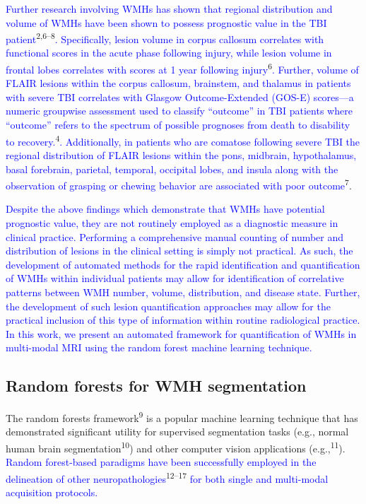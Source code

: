 \documentclass[11pt,]{article}
\begin{document}
\textcolor{blue}{Further research involving WMHs has shown that regional distribution and volume of WMHs have been shown to possess prognostic value in the TBI patient}\textsuperscript{2,6--8}\textcolor{blue}{. Specifically, lesion volume in corpus callosum correlates with functional scores in the acute phase following injury, while lesion volume in frontal lobes correlates with scores at 1 year following injury}\textsuperscript{6}\textcolor{blue}{.
Further, volume of FLAIR lesions within the corpus
callosum, brainstem, and thalamus in patients with severe TBI correlates
with Glasgow Outcome-Extended (GOS-E) scores---a numeric groupwise assessment used to
classify ``outcome'' in TBI patients where ``outcome'' refers to the
spectrum of possible prognoses from death to disability to recovery.}\textsuperscript{4}\textcolor{blue}{. Additionally,
in patients who are comatose following severe TBI
the regional distribution of FLAIR lesions within the pons, midbrain, hypothalamus, basal forebrain, parietal, temporal, occipital lobes, and insula along with the observation of grasping or chewing behavior are associated with poor outcome}\textsuperscript{7}.

\textcolor{blue}{Despite the above findings which demonstrate that WMHs have potential prognostic value, they are not routinely employed as a diagnostic measure in clinical practice.  Performing a comprehensive manual counting of number and distribution of lesions in the clinical setting is simply not practical. As such, the development of automated methods for the rapid identification and quantification of WMHs within individual patients may allow for identification of correlative patterns between WMH number, volume, distribution, and disease state. Further, the development of such lesion quantification approaches may allow for the practical inclusion of this type of information within routine radiological practice.  In this work, we present an automated framework for quantification of WMHs in
multi-modal MRI using the random forest machine learning technique.}

\subsection{Random forests for WMH
segmentation}\label{random-forests-for-wmh-segmentation}

The random forests framework\textsuperscript{9} is a popular machine
learning technique that has demonstrated significant utility for
supervised segmentation tasks (e.g., normal human brain
segmentation\textsuperscript{10}) and other computer vision applications
(e.g.,\textsuperscript{11}).
\textcolor{blue}{Random forest-based paradigms have been successfully employed in the
delineation of other neuropathologies}\textsuperscript{12--17}
\textcolor{blue}{for both single and multi-modal acquisition protocols.}
\end{document}
